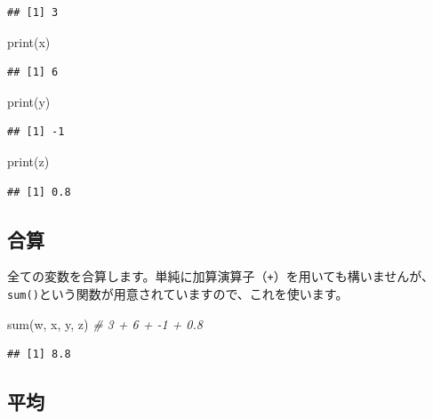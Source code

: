 \documentclass[
  12pt,
]{book}
\newenvironment{Shaded}{\begin{snugshade}}{\end{snugshade}}
\newcommand{\CommentTok}[1]{\textcolor[rgb]{0.56,0.35,0.01}{\textit{#1}}}
\newcommand{\FunctionTok}[1]{\textcolor[rgb]{0.00,0.00,0.00}{#1}}
\newcommand{\NormalTok}[1]{#1}
\begin{document}
\begin{verbatim}
## [1] 3
\end{verbatim}

\begin{Shaded}
\begin{Highlighting}[numbers=left,,]
\FunctionTok{print}\NormalTok{(x)}
\end{Highlighting}
\end{Shaded}

\begin{verbatim}
## [1] 6
\end{verbatim}

\begin{Shaded}
\begin{Highlighting}[numbers=left,,]
\FunctionTok{print}\NormalTok{(y)}
\end{Highlighting}
\end{Shaded}

\begin{verbatim}
## [1] -1
\end{verbatim}

\begin{Shaded}
\begin{Highlighting}[numbers=left,,]
\FunctionTok{print}\NormalTok{(z)}
\end{Highlighting}
\end{Shaded}

\begin{verbatim}
## [1] 0.8
\end{verbatim}

\hypertarget{ux5408ux7b97}{%
\subsection{合算}\label{ux5408ux7b97}}

全ての変数を合算します。単純に加算演算子（\texttt{+}）を用いても構いませんが、\texttt{sum()}という関数が用意されていますので、これを使います。

\begin{Shaded}
\begin{Highlighting}[numbers=left,,]
\FunctionTok{sum}\NormalTok{(w, x, y, z)    }\CommentTok{\# 3 + 6 + {-}1 + 0.8}
\end{Highlighting}
\end{Shaded}

\begin{verbatim}
## [1] 8.8
\end{verbatim}

\hypertarget{ux5e73ux5747-1}{%
\subsection{平均}\label{ux5e73ux5747-1}}
\end{document}
